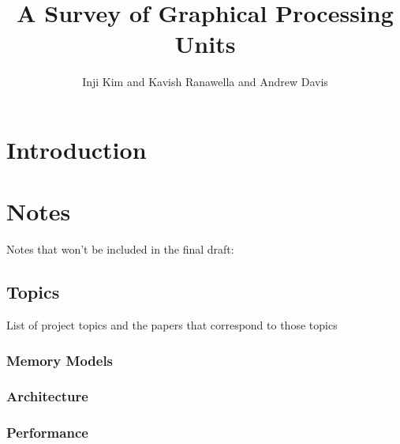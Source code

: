 \documentclass[conference]{IEEEtran}
\title{A Survey of Graphical Processing Units}
\author{\normalsize{Inji Kim and Kavish Ranawella and Andrew Davis}}
\begin{document}
\maketitle
\thispagestyle{plain}
\pagestyle{plain}




\begin{abstract}


\end{abstract}

\section{Introduction}


\clearpage
\appendix
\section{Notes}
Notes that won't be included in the final draft:
\subsection{Topics}
List of project topics and the papers that correspond to those topics
\subsubsection{Memory Models}
\cite{Bakhoda2009}
\subsubsection{Architecture}
\cite{Fung2011HPC}
\subsubsection{Performance}




\end{document}
